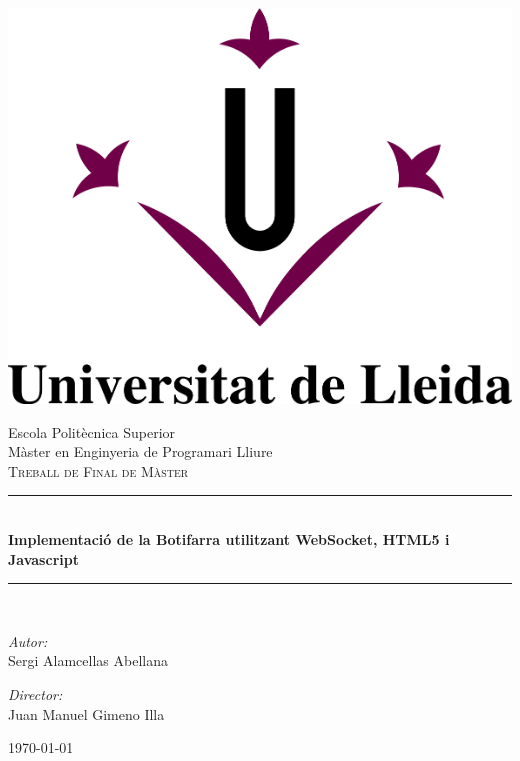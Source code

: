 \begin{titlepage}
\begin{center} 

\includegraphics{img/M-UdL_rs.png}

{\Large Escola Politècnica Superior}\\[1.5cm]   %
\Large Màster en Enginyeria de Programari Lliure\\[3mm]
\textsc{\LARGE Treball de Final de Màster}\\[1.5cm]

\rule{\linewidth}{1.5pt} \\[7mm]

{\huge \bf Implementació de la Botifarra utilitzant WebSocket, HTML5 i Javascript } \\[2mm]
\rule{\linewidth}{1.5pt} \\[1cm]
\large
\begin{minipage}{0.49\textwidth}
\textsl{Autor:}\\Sergi Alamcellas Abellana
\end{minipage}
\begin{minipage}{0.49\textwidth}\begin{flushright}
\textsl{Director:}\\Juan Manuel Gimeno Illa 
\end{flushright}\end{minipage}

\vfill\today

\end{center}
\end{titlepage}
